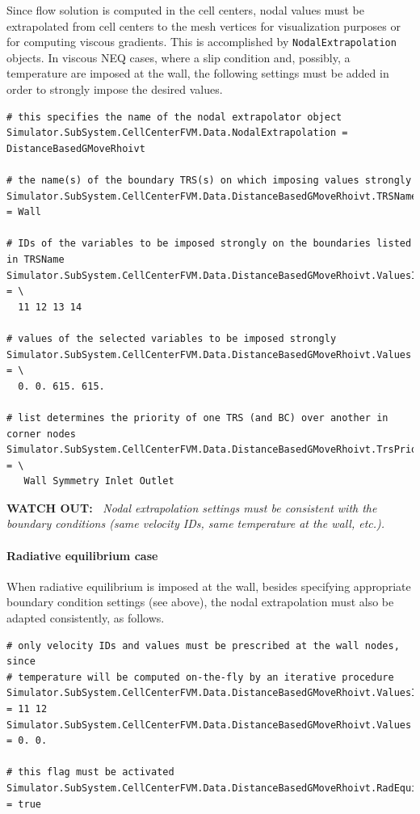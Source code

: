 \documentclass[11pt]{article}
\begin{document}
Since flow solution is computed in the cell centers, nodal values must be extrapolated from cell centers 
to the mesh vertices for visualization purposes or for computing viscous gradients. This is accomplished by 
{\tt NodalExtrapolation} objects. In viscous NEQ cases, where a slip condition and, possibly, a temperature 
are imposed at the wall, the following settings must be added in order to strongly impose the desired values.

\begin{lstlisting}[breaklines]
# this specifies the name of the nodal extrapolator object
Simulator.SubSystem.CellCenterFVM.Data.NodalExtrapolation = DistanceBasedGMoveRhoivt

# the name(s) of the boundary TRS(s) on which imposing values strongly 
Simulator.SubSystem.CellCenterFVM.Data.DistanceBasedGMoveRhoivt.TRSName = Wall

# IDs of the variables to be imposed strongly on the boundaries listed in TRSName
Simulator.SubSystem.CellCenterFVM.Data.DistanceBasedGMoveRhoivt.ValuesIdx = \
  11 12 13 14

# values of the selected variables to be imposed strongly
Simulator.SubSystem.CellCenterFVM.Data.DistanceBasedGMoveRhoivt.Values = \
  0. 0. 615. 615.

# list determines the priority of one TRS (and BC) over another in corner nodes
Simulator.SubSystem.CellCenterFVM.Data.DistanceBasedGMoveRhoivt.TrsPriorityList = \
   Wall Symmetry Inlet Outlet
\end{lstlisting}

{\bf WATCH OUT:~} {\it Nodal extrapolation settings must be consistent with the boundary conditions (same velocity IDs, same temperature at the wall, etc.).}

\paragraph{Radiative equilibrium case}

When radiative equilibrium is imposed at the wall, besides specifying appropriate boundary condition settings (see above),
the nodal extrapolation must also be adapted consistently, as follows.

\begin{lstlisting}[breaklines]
# only velocity IDs and values must be prescribed at the wall nodes, since 
# temperature will be computed on-the-fly by an iterative procedure  
Simulator.SubSystem.CellCenterFVM.Data.DistanceBasedGMoveRhoivt.ValuesIdx = 11 12 
Simulator.SubSystem.CellCenterFVM.Data.DistanceBasedGMoveRhoivt.Values = 0. 0.

# this flag must be activated
Simulator.SubSystem.CellCenterFVM.Data.DistanceBasedGMoveRhoivt.RadEquilibrium = true
\end{lstlisting}
\end{document}
